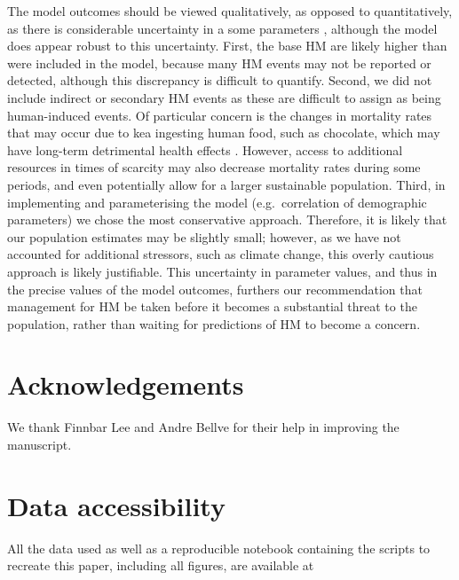 \documentclass[11pt,]{article}
\begin{document}
The model outcomes should be viewed qualitatively, as opposed to
quantitatively, as there is considerable uncertainty in a some
parameters \citep{coulson2001}, although the model does appear robust to
this uncertainty. First, the base HM are likely higher than were
included in the model, because many HM events may not be reported or
detected, although this discrepancy is difficult to quantify. Second, we
did not include indirect or secondary HM events as these are difficult
to assign as being human-induced events. Of particular concern is the
changes in mortality rates that may occur due to kea ingesting human
food, such as chocolate, which may have long-term detrimental health
effects \citep{gartrell2007}. However, access to additional resources in
times of scarcity may also decrease mortality rates during some periods,
and even potentially allow for a larger sustainable population. Third,
in implementing and parameterising the model (e.g.~correlation of
demographic parameters) we chose the most conservative approach.
Therefore, it is likely that our population estimates may be slightly
small; however, as we have not accounted for additional stressors, such
as climate change, this overly cautious approach is likely justifiable.
This uncertainty in parameter values, and thus in the precise values of
the model outcomes, furthers our recommendation that management for HM
be taken before it becomes a substantial threat to the population,
rather than waiting for predictions of HM to become a concern.

\hypertarget{acknowledgements}{%
\section{Acknowledgements}\label{acknowledgements}}

We thank Finnbar Lee and Andre Bellve for their help in improving the
manuscript.

\hypertarget{data-accessibility}{%
\section{Data accessibility}\label{data-accessibility}}

All the data used as well as a reproducible notebook containing the
scripts to recreate this paper, including all figures, are available at

\newpage
\singlespacing 
\renewcommand\refname{References}

\end{document}
